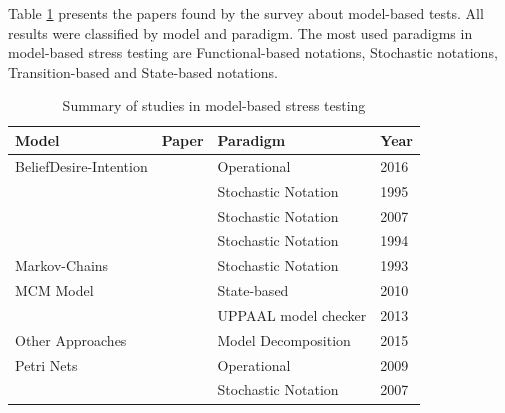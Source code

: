 \documentclass[espaco=umemeio,chapter=TITLE,twoside,openright]{abnt}
\begin{document}
Table \ref{modelsummary} presents the papers found by the survey about model-based tests. All results were classified by model and paradigm. The most used paradigms in model-based stress testing are  Functional-based notations, Stochastic notations, Transition-based and State-based notations. 

\begin{table}[h]
\centering
\caption{Summary of studies in model-based stress testing}
\label{modelsummary}
\begin{tabular}{|l|l|l|l|}
\hline
\rowcolor[HTML]{C0C0C0}
\textbf{Model}                          & \textbf{Paper}          & \textbf{Paradigm}    & \textbf{Year} \\ \hline
BeliefDesire-Intention                  & \cite{Araiza-Illan2016} & Operational          & 2016          \\ \hline
                                        & \cite{Avritzer1995b}    & Stochastic Notation         & 1995          \\ \cline{2-4}
                                        & \cite{Barros2007}       & Stochastic Notation        & 2007          \\ \cline{2-4}
                                        & \cite{Avritzer1994}     & Stochastic Notation        & 1994          \\ \cline{2-4}
\multirow{-4}{*}{Markov-Chains}         & \cite{Avritzer1993}     & Stochastic Notation         & 1993          \\ \hline
MCM Model                               & \begin{minipage}{0.4\textwidth}\cite{Wieczorek2010}\end{minipage}    & State-based          & 2010          \\ \hline
                                        & \begin{minipage}{0.4\textwidth}\cite{Enoiu2013}\end{minipage}        & UPPAAL model checker & 2013          \\ \cline{2-4}
\multirow{-2}{*}{Other Approaches}       & \begin{minipage}{0.4\textwidth}\cite{Arcaini2015}\end{minipage}      & Model Decomposition  & 2015          \\ \hline
Petri Nets                              & \cite{Buchs2009}        & Operational          & 2009          \\ \hline
                                        & \cite{Cai2007}          & Stochastic Notation    & 2007          \\ \cline{2-4}
                                        

\end{tabular}
\end{table}
\end{document}
